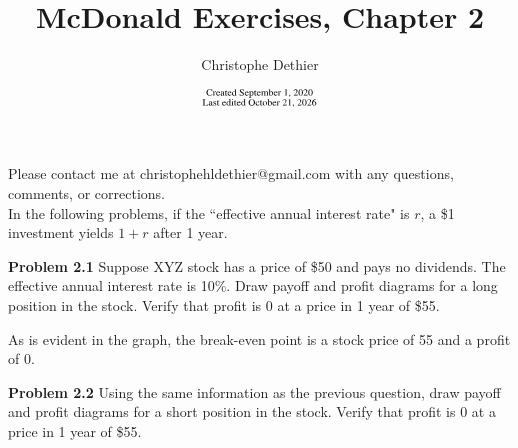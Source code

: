 \documentclass[12pt]{article}
\title{McDonald Exercises, Chapter 2}
\author{Christophe Dethier}
\date{$\substack{\text{Created September 1, 2020}\\\text{Last edited \today}}$}
\newcommand{\problem}[1]{\bigskip \noindent \textbf{Problem #1}}
\theoremstyle{plain}
\begin{document}
\bigskip
\maketitle

Please contact me at christophehldethier@gmail.com with any questions, comments, or corrections.\\

In the following problems, if the ``effective annual interest rate" is $r$, a \$1 investment yields $1 + r$ after 1 year.

\problem{2.1} Suppose XYZ stock has a price of \$50 and pays no dividends. The effective annual interest rate is 10\%. Draw payoff and profit diagrams for a long position in the stock. Verify that profit is 0 at a price in 1 year of \$55.\\

\begin{center}
\end{center}

As is evident in the graph, the break-even point is a stock price of 55 and a profit of 0.

\problem{2.2} Using the same information as the previous question, draw payoff and profit diagrams for a short position in the stock. Verify that profit is 0 at a price in 1 year of \$55.

\begin{center}
\end{center}
\end{document}
